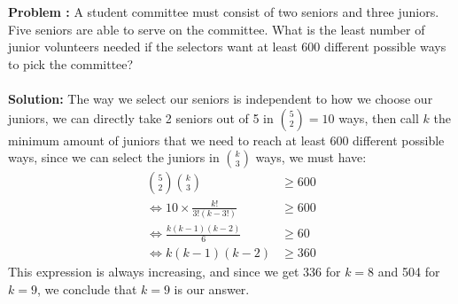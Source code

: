 \documentclass[12pt]{article}
\newcounter{problem}
\newcommand{\problem}[1]{
    \stepcounter{problem}
    \noindent\textbf{Problem \theproblem:} #1
     \\ %
}
\newcommand{\solution}[1]{
    \vspace{1em} %
    \noindent\textbf{Solution:} #1
}
\begin{document}
\begin{spacing}{1.3}
\problem{
        A student committee must consist of two seniors and three juniors. Five seniors are able to
        serve on the committee. What is the least number of junior volunteers needed if the selectors
        want at least 600 different possible ways to pick the committee? \\
        }
\solution{
            The way we select our seniors is independent to how we choose our juniors, we can directly take 2 seniors out of 5 in $\binom{5}{2}=10$ ways, then call $k$ the minimum amount of juniors that we need to reach at least 600 different possible ways, since we can select the juniors in $\binom{k}{3}$ ways, we must have:
            \begin{align*}
                \binom{5}{2}\binom{k}{3} &\geq 600 \\
                \iff 10 \times \frac{k!}{3!(k-3!)} &\geq 600 \\
                \iff \frac{k(k-1)(k-2)}{6} &\geq 60 \\
                \iff k(k-1)(k-2) &\geq 360
            \end{align*}
            This expression is always increasing, and since we get 336 for $k=8$ and 504 for $k=9$, we conclude that $k=9$ is our answer.
            }

\end{spacing}
\end{document}

